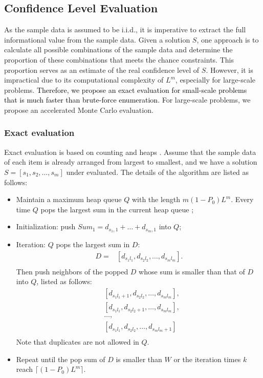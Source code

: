 \documentclass[lettersize,journal]{IEEEtran}
\begin{document}
\subsection{Confidence Level Evaluation}
As the sample data is assumed to be i.i.d., it is imperative to extract the full informational value from the sample data.
Given a solution $S$, one approach is to calculate all possible combinations of the sample data and determine the proportion of these combinations that meets the chance constraints.  
This proportion serves as an estimate of the real confidence level of $S$. 
However, it is impractical due to its computational complexity of $L^m$, especially for large-scale problems.
\textcolor{black}{Therefore, we propose an exact evaluation for small-scale problems that is much faster than brute-force enumeration.}
For large-scale problems, we propose an accelerated Monte Carlo evaluation.

\subsubsection{Exact evaluation}
Exact evaluation is based on counting and heaps \cite{ferreira1996fast}.
Assume that the sample data of each item is already arranged from largest to smallest, and we have a solution $S = [s_1,s_2,\ldots,s_m]$ under evaluated. 
The details of the algorithm are listed as follows:
\begin{itemize}
    \item Maintain a maximum heap queue $Q$ with the length $m(1-P_0)L^m$. Every time $Q$ pops the largest sum in the current heap queue \cite{ferreira1996fast};
    \item Initialization: push $Sum_1 = d_{s_1,1}+\ldots+d_{s_m,1}$ into $Q$;
    \item Iteration: $Q$ pops the largest sum in $D$:
    \begin{equation*}
        \begin{aligned}
           D =  &[d_{s_1l_1},d_{s_2l_2},\ldots,d_{s_ml_m}].\\
        \end{aligned}
    \end{equation*}
    Then push neighbors of the popped $D$ whose sum is smaller than that of $D$ into $Q$, listed as follows:
    \begin{equation*}
        \begin{aligned}
        &[d_{s_1l_1+1},d_{s_2l_2},\ldots,d_{s_ml_m}],\\
        &[d_{s_1l_1},d_{s_2l_2+1},\ldots,d_{s_ml_m}],\\
        &\ldots,\\
        &[d_{s_1l_1},d_{s_2l_2},\ldots,d_{s_ml_m+1}]\\
    \end{aligned}
    \end{equation*}
    Note that duplicates are not allowed in $Q$.
    \item Repeat until the pop sum of $D$ is smaller than $W$ or the iteration times $k$ reach $ \lceil(1-P_0)L^m\rceil$.
\end{itemize}
\end{document}
